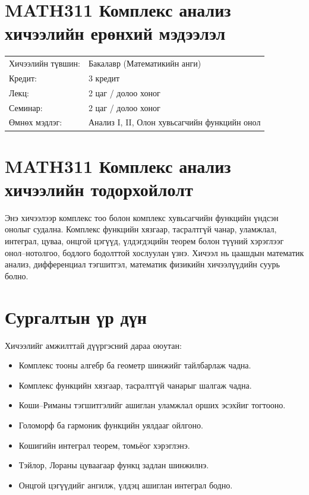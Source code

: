 
\section*{MATH311 Комплекс анализ хичээлийн ерөнхий мэдээлэл}

\begin{tabular}{ll}
Хичээлийн түвшин: & Бакалавр (Математикийн анги) \\
Кредит: & 3 кредит \\
Лекц: & 2 цаг / долоо хоног \\
Семинар: & 2 цаг / долоо хоног \\
Өмнөх мэдлэг: & Анализ I, II, Олон хувьсагчийн функцийн онол
\end{tabular}


\section*{MATH311 Комплекс анализ хичээлийн тодорхойлолт}

Энэ хичээлээр комплекс тоо болон комплекс хувьсагчийн функцийн үндсэн онолыг судална. Комплекс функцийн хязгаар, тасралтгүй чанар, уламжлал, интеграл, цуваа, онцгой цэгүүд, үлдэгдэцийн теорем болон түүний хэрэглээг онол–нотолгоо, бодлого бодолттой хослуулан үзнэ. Хичээл нь цаашдын математик анализ, дифференциал тэгшитгэл, математик физикийн хичээлүүдийн суурь болно.


\section*{Сургалтын үр дүн}

Хичээлийг амжилттай дүүргэсний дараа оюутан:
\begin{itemize}
\item Комплекс тооны алгебр ба геометр шинжийг тайлбарлаж чадна.
\item Комплекс функцийн хязгаар, тасралтгүй чанарыг шалгаж чадна.
\item Коши--Риманы тэгшитгэлийг ашиглан уламжлал орших эсэхйиг тогтооно.
\item Голоморф ба гармоник функцийн уялдааг ойлгоно.
\item Кошигийн интеграл теорем, томьёог хэрэглэнэ.
\item Тэйлор, Лораны цуваагаар функц задлан шинжилнэ.
\item Онцгой цэгүүдийг ангилж, үлдэц ашиглан интеграл бодно.
\end{itemize}

